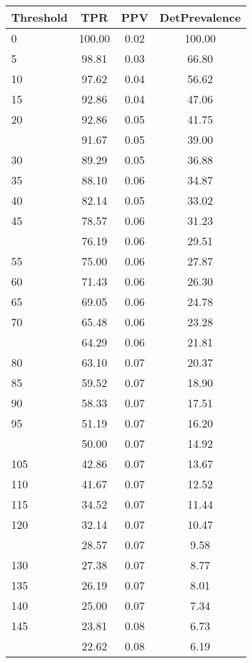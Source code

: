 \begin{table}[ht]
\centering
\begin{tabular}{lccc}
  \toprule
Threshold & TPR & PPV & DetPrevalence \\ 
  \midrule
0 & 100.00 & 0.02 & 100.00 \\ 
  5 & 98.81 & 0.03 & 66.80 \\ 
  10 & 97.62 & 0.04 & 56.62 \\ 
  15 & 92.86 & 0.04 & 47.06 \\ 
  20 & 92.86 & 0.05 & 41.75 \\ 
   \addlinespace
25 & 91.67 & 0.05 & 39.00 \\ 
  30 & 89.29 & 0.05 & 36.88 \\ 
  35 & 88.10 & 0.06 & 34.87 \\ 
  40 & 82.14 & 0.05 & 33.02 \\ 
  45 & 78.57 & 0.06 & 31.23 \\ 
   \addlinespace
50 & 76.19 & 0.06 & 29.51 \\ 
  55 & 75.00 & 0.06 & 27.87 \\ 
  60 & 71.43 & 0.06 & 26.30 \\ 
  65 & 69.05 & 0.06 & 24.78 \\ 
  70 & 65.48 & 0.06 & 23.28 \\ 
   \addlinespace
75 & 64.29 & 0.06 & 21.81 \\ 
  80 & 63.10 & 0.07 & 20.37 \\ 
  85 & 59.52 & 0.07 & 18.90 \\ 
  90 & 58.33 & 0.07 & 17.51 \\ 
  95 & 51.19 & 0.07 & 16.20 \\ 
   \addlinespace
100 & 50.00 & 0.07 & 14.92 \\ 
  105 & 42.86 & 0.07 & 13.67 \\ 
  110 & 41.67 & 0.07 & 12.52 \\ 
  115 & 34.52 & 0.07 & 11.44 \\ 
  120 & 32.14 & 0.07 & 10.47 \\ 
   \addlinespace
125 & 28.57 & 0.07 & 9.58 \\ 
  130 & 27.38 & 0.07 & 8.77 \\ 
  135 & 26.19 & 0.07 & 8.01 \\ 
  140 & 25.00 & 0.07 & 7.34 \\ 
  145 & 23.81 & 0.08 & 6.73 \\ 
   \addlinespace
150 & 22.62 & 0.08 & 6.19 \\ 

\end{tabular}
\end{table}
